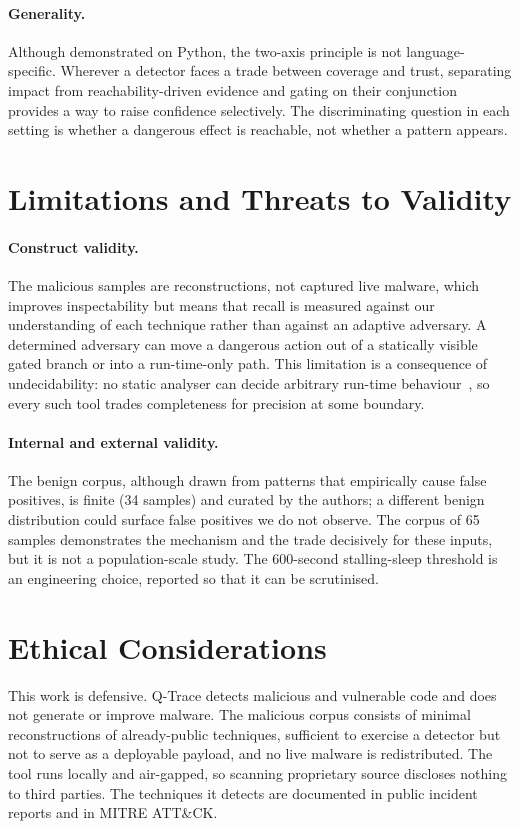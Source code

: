 \documentclass[runningheads]{llncs}
\begin{document}
\paragraph{Generality.} Although demonstrated on Python, the two-axis principle is
not language-specific. Wherever a detector faces a trade between coverage and
trust, separating impact from reachability-driven evidence and gating on their
conjunction provides a way to raise confidence selectively. The discriminating
question in each setting is whether a dangerous effect is reachable, not whether a
pattern appears.

\section{Limitations and Threats to Validity}\label{sec:limits}
\paragraph{Construct validity.} The malicious samples are reconstructions, not
captured live malware, which improves inspectability but means that recall is
measured against our understanding of each technique rather than against an
adaptive adversary. A determined adversary can move a dangerous action out of a
statically visible gated branch or into a run-time-only path. This limitation is a
consequence of undecidability: no static analyser can decide arbitrary run-time
behaviour~\cite{rice}, so every such tool trades completeness for precision at some
boundary.

\paragraph{Internal and external validity.} The benign corpus, although drawn from
patterns that empirically cause false positives, is finite (34 samples) and
curated by the authors; a different benign distribution could surface false
positives we do not observe. The corpus of 65 samples demonstrates the mechanism
and the trade decisively for these inputs, but it is not a population-scale study.
The 600-second stalling-sleep threshold is an engineering choice, reported so that
it can be scrutinised.

\section{Ethical Considerations}\label{sec:ethics}
This work is defensive. Q-Trace detects malicious and vulnerable code and does not
generate or improve malware. The malicious corpus consists of minimal
reconstructions of already-public techniques, sufficient to exercise a detector
but not to serve as a deployable payload, and no live malware is redistributed.
The tool runs locally and air-gapped, so scanning proprietary source discloses
nothing to third parties. The techniques it detects are documented in public
incident reports and in MITRE ATT\&CK.
\end{document}
